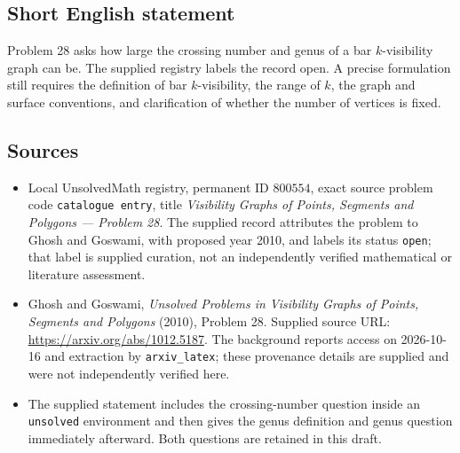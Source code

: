 \documentclass[11pt]{article}
\begin{document}
\subsection{Short English statement}
Problem 28 asks how large the crossing number and genus of a bar \(k\)-visibility graph can be. The supplied registry labels the record open. A precise formulation still requires the definition of bar \(k\)-visibility, the range of \(k\), the graph and surface conventions, and clarification of whether the number of vertices is fixed.
\subsection{Sources}
\begin{itemize}
\item Local UnsolvedMath registry, permanent ID \(800554\), exact source problem code \texttt{catalogue entry}, title \emph{Visibility Graphs of Points, Segments and Polygons --- Problem 28}. The supplied record attributes the problem to Ghosh and Goswami, with proposed year 2010, and labels its status \texttt{open}; that label is supplied curation, not an independently verified mathematical or literature assessment.
\item Ghosh and Goswami, \emph{Unsolved Problems in Visibility Graphs of Points, Segments and Polygons} (2010), Problem 28. Supplied source URL: \url{https://arxiv.org/abs/1012.5187}. The background reports access on 2026-10-16 and extraction by \texttt{arxiv\_latex}; these provenance details are supplied and were not independently verified here.
\item The supplied statement includes the crossing-number question inside an \texttt{unsolved} environment and then gives the genus definition and genus question immediately afterward. Both questions are retained in this draft.
\end{itemize}
\end{document}

